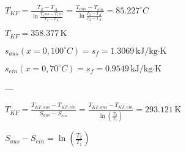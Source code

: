 \( T_{KF} = \frac{T_2 - T_A}{\ln \frac{T_aus - T_ein}{T_2 - T_A}} = \frac{T_{aus} - T_{ein}}{\ln \frac{T_2 - T_A}{T_2 - T_A}} = 85.227^\circ C \)  

\( T_{KF} = 358.377 \, \text{K} \)  

\( s_{aus} (x = 0, 100^\circ C) = s_f = 1.3069 \, \text{kJ/kg·K} \)  

\( s_{ein} (x = 0, 70^\circ C) = s_f = 0.9549 \, \text{kJ/kg·K} \)  

---

\( T_{KF} = \frac{T_{KF,aus} - T_{KF,ein}}{S_{aus} - S_{ein}} = \frac{T_{KF,aus} - T_{KF,ein}}{\ln\left(\frac{T_2}{T_1}\right)} = 293.121 \, \text{K} \)  

\( S_{aus} - S_{ein} = \ln\left(\frac{T_2}{T_1}\right) \)